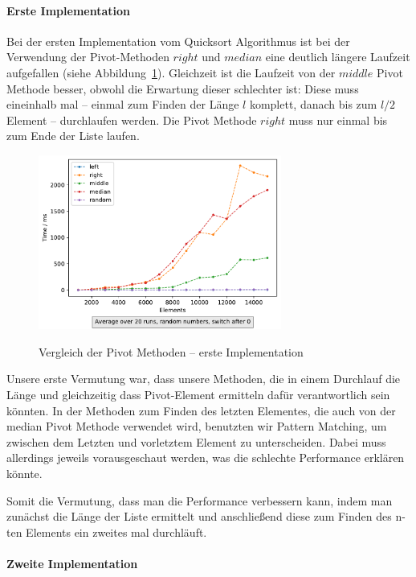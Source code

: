 \paragraph{Erste Implementation}
Bei der ersten Implementation vom Quicksort Algorithmus ist bei der
Verwendung der Pivot-Methoden \(right\) und \(median\)  eine deutlich längere
Laufzeit aufgefallen (siehe Abbildung~\ref{fig:qsort-first-impl}).
Gleichzeit ist die Laufzeit von der \(middle\) Pivot Methode besser, obwohl
die Erwartung dieser schlechter ist:
Diese muss eineinhalb mal -- einmal zum Finden der Länge \(l\) komplett, danach
bis zum \(l/2\) Element -- durchlaufen werden.
Die Pivot Methode \(right\) muss nur einmal bis zum Ende der Liste laufen.

\begin{figure}[hbt]
    \caption{Vergleich der Pivot Methoden -- erste Implementation}
    \centering
    \includegraphics[width = 8cm]
    {../out/pivotMethods_Implementation1.pdf}\label{fig:qsort-first-impl}
\end{figure}

Unsere erste Vermutung war, dass unsere Methoden, die in einem
Durchlauf die Länge und gleichzeitig dass Pivot-Element ermitteln dafür
verantwortlich sein könnten.
In der Methoden zum Finden des letzten Elementes, die auch von der median
Pivot Methode verwendet wird, benutzten wir Pattern Matching, um zwischen dem
Letzten und vorletztem Element zu unterscheiden.
Dabei muss allerdings jeweils vorausgeschaut werden, was die schlechte
Performance erklären könnte.

Somit die Vermutung, dass man die Performance verbessern kann, indem man
zunächst die Länge der Liste ermittelt und anschließend diese zum Finden des
n-ten Elements ein zweites mal durchläuft.

\paragraph{Zweite Implementation}

